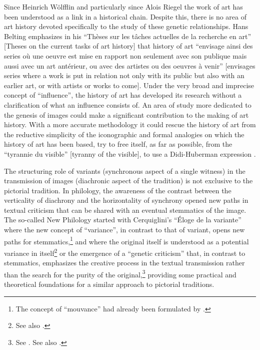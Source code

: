 \begin{paper}
Since Heinrich Wölfflin and particularly since Alois Riegel the work of
art has been understood as a link in a historical chain. Despite this,
there is no area of art history devoted specifically to the study of
these genetic relationships. Hans Belting emphasizes in his ``Thèses sur
les tâches actuelles de la recherche en art'' {[}Theses on the current
tasks of art history{]} that history of art ``envisage ainsi des series
où une oeuvre est mise en rapport non seulement avec son publique mais
aussi avec un art antérieur, ou avec des artistes ou des oeuvres à
venir'' {[}envisages series where a work is put in relation not only
with its public but also with an earlier art, or with artists or works
to come{]}\citep[44]{belting_histoire_1989}. Under the
very broad and imprecise concept of ``influence'', the history of art
has developed its research without a clarification of what an influence
consists of. An area of study more dedicated to the genesis of images
could make a significant contribution to the making of art history. With
a more accurate methodology it could rescue the history of art from the
reductive simplicity of the iconographic and formal analogies on which
the history of art has been based, try to free itself, as far as
possible, from the ``tyrannie du visible'' {[}tyranny of the visible{]},
to use a Didi-Huberman expression \citep[64]{didi_devant_1990}.

The structuring role of variants (synchronous aspect of a single
witness) in the transmission of images (diachronic aspect of the
tradition) is not exclusive to the pictorial tradition. In philology,
the awareness of the contrast between the verticality of diachrony and
the horizontality of synchrony opened new paths in textual criticism
that can be shared with an eventual stemmatics of the image. The
so-called New Philology started with Cerquiglini's ``Éloge de la
variante''\citep{cerquiglini_eloge_1989} where
the new concept of ``variance'', in contrast to that of variant, opens
new paths for stemmatics,\footnote{The concept of ``mouvance'' had
  already been formulated by \citet{zumthor_essai_1972}.} and where the original itself is
understood as a potential variance in itself\footnote{See also \citealt{canfora_copista_2002}.} or the
emergence of a ``genetic criticism'' that, in contrast to stemmatics,
emphasizes the creative process in the textual transmission rather than
the search for the purity of the original,\footnote{See \citealt{ferrer_production_2002}. See also
  \citealt{biasi_oeuvre_2017}.} providing some
practical and theoretical foundations for a similar approach to
pictorial traditions.


\begin{flushleft}
    \renewcommand*{\mkbibnamefamily}[1]{\textsc{#1}}
    \renewcommand*{\mkbibnamegiven}[1]{\textsc{#1}} 
\printbibliography
\end{flushleft}

\end{paper}